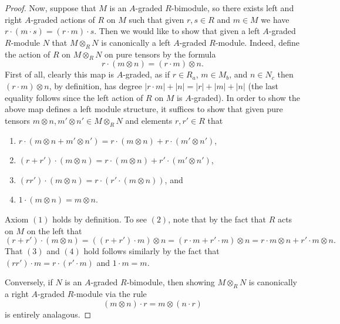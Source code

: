 \documentclass[../main.tex]{subfiles}
\begin{document}
\begin{proof}
	Now, suppose that $M$ is an $A$-graded $R$-bimodule, so there exists left and right $A$-graded actions of $R$ on $M$ such that given $r,s\in R$ and $m\in M$ we have $r\cdot(m\cdot s)=(r\cdot m)\cdot s$. Then we would like to show that given a left $A$-graded $R$-module $N$ that $M\otimes_RN$ is canonically a left $A$-graded $R$-module. Indeed, define the action of $R$ on $M\otimes_RN$ on pure tensors by the formula
	\[r\cdot(m\otimes n)=(r\cdot m)\otimes n.\]
	First of all, clearly this map is $A$-graded, as if $r\in R_a$, $m\in M_b$, and $n\in N_c$ then $(r\cdot m)\otimes n$, by definition, has degree $|r\cdot m|+|n|=|r|+|m|+|n|$ (the last equality follows since the left action of $R$ on $M$ is $A$-graded). In order to show the above map defines a left module structure, it suffices to show that given pure tensors $m\otimes n,m'\otimes n'\in M\otimes_RN$ and elements $r,r'\in R$ that
	\begin{enumerate}
		\item $r\cdot(m\otimes n+m'\otimes n')=r\cdot(m\otimes n)+r\cdot( m'\otimes n')$,
		\item $(r+r')\cdot(m\otimes n)=r\cdot(m\otimes n)+r'\cdot(m'\otimes n')$,
		\item $(rr')\cdot(m\otimes n)=r\cdot(r'\cdot(m\otimes n))$, and
		\item $1\cdot (m\otimes n)=m\otimes n$.
	\end{enumerate}
	Axiom $(1)$ holds by definition. To see $(2)$, note that by the fact that $R$ acts on $M$ on the left that
	\[(r+r')\cdot(m\otimes n)=((r+r')\cdot m)\otimes n=(r\cdot m+r'\cdot m)\otimes n=r\cdot m\otimes n+r'\cdot m\otimes n.\]
	That $(3)$ and $(4)$ hold follows similarly by the fact that $(rr')\cdot m=r\cdot(r'\cdot m)$ and $1\cdot m=m$.

	Conversely, if $N$ is an $A$-graded $R$-bimodule, then showing $M\otimes_RN$ is canonically a right $A$-graded $R$-module via the rule
	\[(m\otimes n)\cdot r=m\otimes(n\cdot r)\]
	is entirely analagous.
\end{proof}
\end{document}
